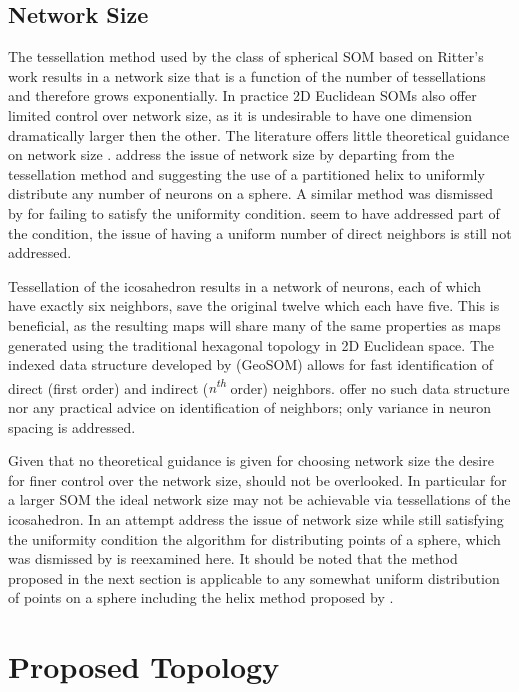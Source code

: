 \documentclass[12pt]{article}
\begin{document}
\subsection{Network Size}
The tessellation method used by the class of spherical SOM based on Ritter's
work results in a network size that is a function of the number of
tessellations and therefore grows exponentially. In practice 2D Euclidean SOMs
also offer limited control over network size, as it is undesirable to have one
dimension dramatically larger then the other.  The literature offers little
theoretical guidance on network size \citep{cho1996}.  \cite{Nishio:2006fk}
address the issue of network size by departing from the tessellation method
and suggesting the use of a partitioned helix to uniformly distribute any
number of neurons on a sphere.  A similar method was dismissed by
\cite{wu2005} for failing to satisfy the uniformity condition.
\citeauthor{Nishio:2006fk} seem to have addressed part of the condition, the
issue of having a uniform number of direct neighbors is still not addressed.

Tessellation of the icosahedron results in a network of neurons, each of which
have exactly six neighbors, save the original twelve which each have five.
This is beneficial, as the resulting maps will share many of the same
properties as maps generated using the traditional hexagonal topology in 2D
Euclidean space. The indexed data structure developed by
\citeauthor{Wu:2006lr} (GeoSOM) allows for fast identification of direct
(first order) and indirect (\textit{n\textsuperscript{th}} order) neighbors.
\cite{Nishio:2006fk} offer no such data structure nor any practical advice on
identification of neighbors; only variance in neuron spacing is addressed.

Given that no theoretical guidance is given for choosing network size the
desire for finer control over the network size, should not be overlooked. In
particular for a larger SOM the ideal network size may not be achievable via
tessellations of the icosahedron.  In an attempt address the issue of network
size while still satisfying the uniformity condition the \cite{Rakhmanov94}
algorithm for distributing points of a sphere, which was dismissed by
\cite{wu2005} is reexamined here.  It should be noted that the method proposed
in the next section is applicable to any somewhat uniform distribution of
points on a sphere including the helix method proposed by
\cite{Nishio:2006fk}.

\section{Proposed Topology}
\end{document}
